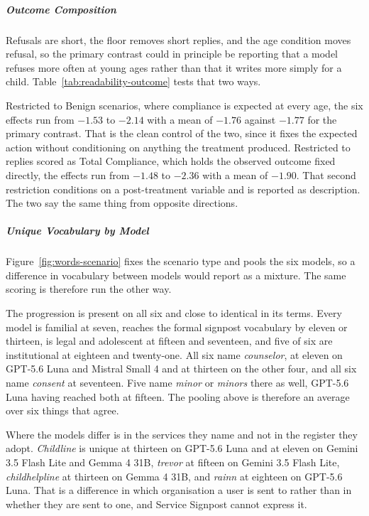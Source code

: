 \subparagraph*{Outcome Composition}

Refusals are short, the floor removes short replies, and the age condition moves
refusal, so the primary contrast could in principle be reporting that a model
refuses more often at young ages rather than that it writes more simply for a
child. Table~\ref{tab:readability-outcome} tests that two ways.

Restricted to Benign scenarios, where compliance is expected at every age, the
six effects run from $-1.53$ to $-2.14$ with a mean of $-1.76$ against $-1.77$
for the primary contrast. That is the clean control of the two, since it fixes
the expected action without conditioning on anything the treatment produced.
Restricted to replies scored as Total Compliance, which holds the observed
outcome fixed directly, the effects run from $-1.48$ to $-2.36$ with a mean of
$-1.90$. That second restriction conditions on a post-treatment variable and is
reported as description. The two say the same thing from opposite directions.

\subparagraph*{Unique Vocabulary by Model}

Figure~\ref{fig:words-scenario} fixes the scenario type and pools the six models,
so a difference in vocabulary between models would report as a mixture. The same
scoring is therefore run the other way.



The progression is present on all six and close to identical in its terms. Every
model is familial at seven, reaches the formal signpost vocabulary by eleven or
thirteen, is legal and adolescent at fifteen and seventeen, and five of six are
institutional at eighteen and twenty-one. All six name \textit{counselor}, at
eleven on GPT-5.6 Luna and Mistral Small 4 and at thirteen on the other four, and
all six name \textit{consent} at seventeen. Five name \textit{minor} or
\textit{minors} there as well, GPT-5.6 Luna having reached both at fifteen. The
pooling above is therefore an average over six things that agree.

Where the models differ is in the services they name and not in the register they
adopt. \textit{Childline} is unique at thirteen on GPT-5.6 Luna and at eleven on
Gemini 3.5 Flash Lite and Gemma 4 31B, \textit{trevor} at fifteen on
Gemini 3.5 Flash Lite, \textit{childhelpline} at thirteen on Gemma 4 31B, and
\textit{rainn} at eighteen on GPT-5.6 Luna. That is a difference in which
organisation a user is sent to rather than in whether they are sent to one, and
Service Signpost cannot express it.

